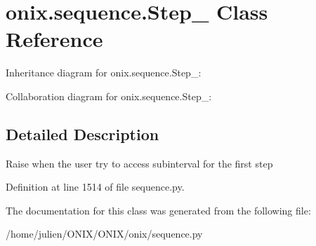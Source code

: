 \hypertarget{classonix_1_1sequence_1_1Step__0}{}\section{onix.\+sequence.\+Step\+\_ Class Reference}
\label{classonix_1_1sequence_1_1Step__0}


Inheritance diagram for onix.\+sequence.\+Step\+\_\+:


Collaboration diagram for onix.\+sequence.\+Step\+\_\+:


\subsection{Detailed Description}
\begin{DoxyVerb}Raise when the user try to access subinterval for the first step\end{DoxyVerb}
 

Definition at line 1514 of file sequence.\+py.



The documentation for this class was generated from the following file\+:\begin{DoxyCompactItemize}
\item 
/home/julien/\+O\+N\+I\+X/\+O\+N\+I\+X/onix/sequence.\+py\end{DoxyCompactItemize}
